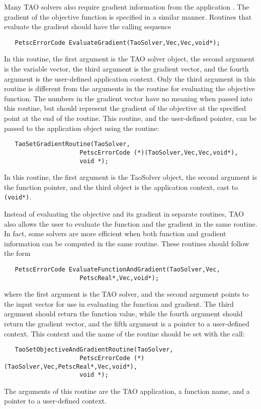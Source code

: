 Many TAO solvers also require gradient information from the 
application .
  The gradient of the objective function is specified in a similar manner.
Routines that evaluate the gradient should have the calling sequence
\begin{verbatim}
   PetscErrorCode EvaluateGradient(TaoSolver,Vec,Vec,void*);
\end{verbatim}
\noindent
In this routine, the first
argument is the TAO solver object, the second argument is the variable
vector, the third argument is the gradient vector, and the fourth argument is
the user-defined application context.  Only the third argument in this
routine is different from the arguments in the routine for evaluating
the objective function.  The numbers in the gradient vector have no
meaning when passed into this routine, but should represent the gradient
of the objective at the specified point at the end of the routine.
This routine, and the user-defined pointer, can be passed to the application
object using the routine: 
\begin{verbatim}
   TaoSetGradientRoutine(TaoSolver,
                     PetscErrorCode (*)(TaoSolver,Vec,Vec,void*),
                     void *);
\end{verbatim}
\noindent
In this routine, the first argument is the TaoSolver object, the second argument
is the function pointer, and the third object is the application context, cast
to {\tt (void*)}.

Instead of evaluating the objective and its gradient in separate
routines, TAO also allows the user to evaluate the function and the gradient
in the same routine.  In fact, some solvers are more efficient when
both function and gradient information can be computed in the same routine.
These routines should follow the form
\begin{verbatim}
   PetscErrorCode EvaluateFunctionAndGradient(TaoSolver,Vec,
                     PetscReal*,Vec,void*);
\end{verbatim}
\noindent
where the first
argument is the TAO solver, and the second
argument points to the input vector for use in evaluating the
function and gradient. The third argument should return the
function value, while the fourth argument should return the gradient vector,
and the fifth argument is a pointer to a user-defined context.
This context and the name of the routine should be set with the
call: 
\begin{verbatim}
   TaoSetObjectiveAndGradientRoutine(TaoSolver,
                     PetscErrorCode (*)(TaoSolver,Vec,PetscReal*,Vec,void*),
                     void *);
\end{verbatim}
\noindent
The arguments of this routine are the TAO application, a
function name, and a pointer to a user-defined context.


